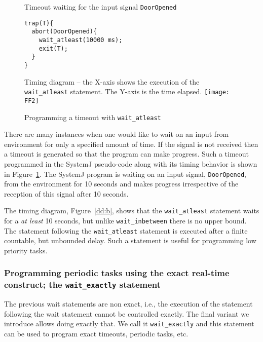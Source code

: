 \begin{figure}[b!]
	\centering
	\vspace{-10pt}
        \begin{SubFloat}{\label{dd:a}Timeout waiting for the input
            signal \texttt{DoorOpened}}
        \begin{lstlisting}[style=sysj,morekeywords={abort,await,emit,present,trap,pause,exit,wait_atleast,suspend}]
trap(T){
  abort(DoorOpened){
    wait_atleast(10000 ms);
    exit(T);  
  }
}
\end{lstlisting}
\end{SubFloat}
\begin{SubFloat}{\label{dd:b}Timing diagram -- the X-axis shows the
    execution of the \texttt{wait\_atleast} statement. The Y-axis is the
    time elapsed.}
\texttt{[image: FF2]}
\end{SubFloat}
\caption{Programming a timeout with \texttt{wait\_atleast}}
\label{dd}
\end{figure}

There are many instances when one would like to wait on an input from
environment for only a specified amount of time. If the signal is not
received then a timeout is generated so that the program can make
progress. Such a timeout programmed in the SystemJ pseudo-code along
with its timing behavior is shown in Figure~\ref{dd}. The SystemJ
program is waiting on an input signal, \texttt{DoorOpened}, from the
environment for 10 seconds and makes progress irrespective of the
reception of this signal after 10 seconds.

The timing diagram, Figure~\ref{dd:b}, shows that the
\texttt{wait\_atleast} statement waits for a \textit{at least} 10
seconds, but unlike \texttt{wait\_inbetween} there is no upper
bound. The statement following the \texttt{wait\_atleast} statement is
executed after a finite countable, but unbounded delay. Such a statement
is useful for programming low priority tasks.


\subsubsection{Programming periodic tasks using the exact real-time
  construct; the \texttt{wait\_exactly} statement}
\label{sec:progr-using-exact}

The previous wait statements are non exact, i.e., the execution of the
statement following the wait statement cannot be controlled exactly. The
final variant we introduce allows doing exactly that. We call it
\texttt{wait\_exactly} and this statement can be used to program exact
timeouts, periodic tasks, etc.

